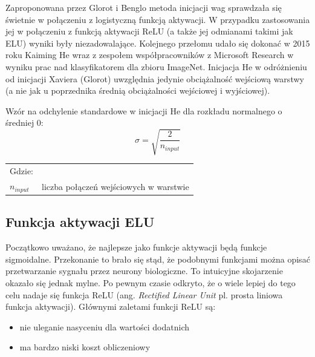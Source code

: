 \documentclass[a4paper,12pt]{article}
\numberwithin{figure}{section}
\begin{document}
    \bigskip

    Zaproponowana przez Glorot i Benglo metoda inicjacji wag sprawdzała się świetnie w połączeniu z logistyczną funkcją aktywacji. W przypadku zastosowania jej w połączeniu z funkcją aktywacji ReLU (a także jej odmianami takimi jak ELU) wyniki były niezadowalające. Kolejnego przełomu udało się dokonać w 2015 roku Kaiming He wraz z zespołem współpracowników z Microsoft Research w wyniku prac nad klasyfikatorem dla zbioru ImageNet\cite{DelvingDeepIntoRectifiers2015}. Inicjacja He w odróżnieniu od inicjacji Xaviera (Glorot) uwzględnia jedynie obciążalność wejściową warstwy (a nie jak u poprzednika średnią obciążalności wejściowej i wyjściowej)\cite{UczenieMaszynowe2018}.

    \bigskip

    \noindent
    \begin{minipage}[H]{\textwidth}
        \setlength\parindent{17pt} Wzór na odchylenie standardowe w inicjacji He dla rozkładu normalnego o średniej 0: \\
        \begin{equation}
            \label{eq:std_dev_he}
            \sigma = \sqrt{\frac{2}{n_{input}}}
        \end{equation}
        \smallskip
        \begin{tabular}{p{}p{}}
            Gdzie: \\
            $n_{input}$ & liczba połączeń wejściowych w warstwie \\
        \end{tabular}
    \end{minipage}

    \subsection{Funkcja aktywacji ELU}

    Początkowo uważano, że najlepsze jako funkcje aktywacji będą funkcje sigmoidalne. Przekonanie to brało się stąd, że podobnymi funkcjami można opisać przetwarzanie sygnału przez neurony biologiczne. To intuicyjne skojarzenie okazało się jednak mylne. Po pewnym czasie odkryto, że o wiele lepiej do tego celu nadaje się funkcja ReLU (ang. \textit{Rectified Linear Unit} pl. prosta liniowa funkcja aktywacji)\cite{UczenieMaszynowe2018}. Głównymi zaletami funkcji ReLU są:
    \begin{itemize}
        \item nie uleganie nasyceniu dla wartości dodatnich
        \item ma bardzo niski koszt obliczeniowy
    \end{itemize}
\end{document}

